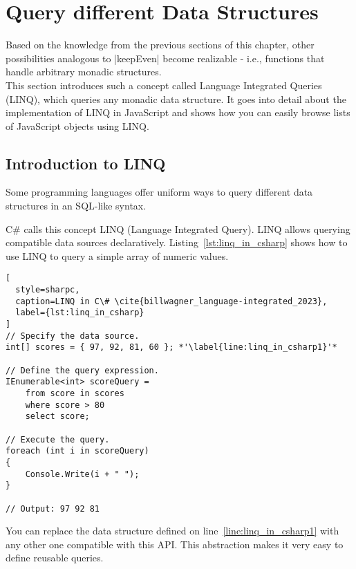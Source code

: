 \section{Query different Data Structures}
\label{sec:Query different Data Structures}
Based on the knowledge from the previous sections of this chapter, other
possibilities analogous to |keepEven| become realizable - i.e., functions that
handle arbitrary monadic structures. \\ 
This section introduces such a concept called Language Integrated Queries
(LINQ), which queries any monadic data structure. It goes into detail
about the implementation of LINQ in JavaScript and shows how you can easily
browse lists of JavaScript objects using LINQ.

\subsection{Introduction to LINQ} %
\label{sub:Introduction to LINQ}
Some programming languages offer uniform ways to query different data
structures in an SQL-like syntax.

C\# calls this concept LINQ (Language Integrated Query).
LINQ allows querying compatible data sources declaratively. 
Listing~\ref{lst:linq_in_csharp} shows how to use LINQ to query a simple array 
of numeric values.

\begin{lstlisting}[
  style=sharpc,
  caption=LINQ in C\# \cite{billwagner_language-integrated_2023},
  label={lst:linq_in_csharp}
]
// Specify the data source.
int[] scores = { 97, 92, 81, 60 }; *'\label{line:linq_in_csharp1}'*

// Define the query expression.
IEnumerable<int> scoreQuery =
    from score in scores
    where score > 80
    select score;

// Execute the query.
foreach (int i in scoreQuery)
{
    Console.Write(i + " ");
}

// Output: 97 92 81
\end{lstlisting}

You can replace the data structure defined on line~\ref{line:linq_in_csharp1}
with any other one compatible with this API. This abstraction makes it very
easy to define reusable queries.



